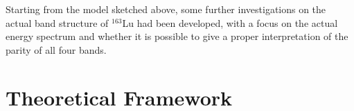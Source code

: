 \documentclass[%
 reprint,
 amsmath,
 amssymb,
 aps,
]{revtex4-2}
\begin{document}
Starting from the model sketched above, some further investigations on the actual band structure of $^{163}$Lu had been developed, with a focus on the actual energy spectrum and whether it is possible to give a proper interpretation of the parity of all four bands.

\section{Theoretical Framework}

\end{document}
